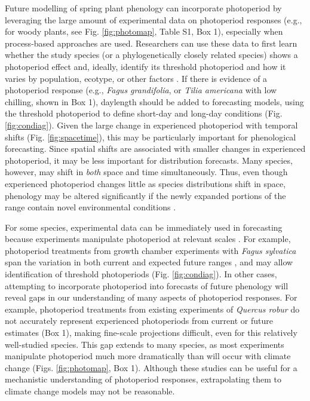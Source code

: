 \documentclass{article}
\begin{document}
\par Future modelling of spring plant phenology can incorporate photoperiod by leveraging the large amount of experimental data on photoperiod responses (e.g., for woody plants, see Fig. \ref{fig:photomap}, Table S1, Box 1), especially when process-based approaches are used. Researchers can use these data to first learn whether the study species (or a phylogenetically closely related species) shows a photoperiod effect and, ideally, identify its threshold photoperiod and how it varies by population, ecotype, or other factors \citep{tobin2008,bradshaw2006}. If there is evidence of a photoperiod response (e.g., \emph{Fagus grandifolia}, or \emph{Tilia americana} with low chilling, shown in Box 1), daylength should be added to forecasting models, using the threshold photoperiod to define short-day and long-day conditions (Fig. \ref{fig:condiag}). Given the large change in experienced photoperiod with temporal shifts (Fig. \ref{fig:spacetime}), this may be particularly important for phenological forecasting. Since spatial shifts are associated with smaller changes in experienced photoperiod, it may be less important for distribution forecasts. Many species, however, may shift in \emph{both} space and time simultaneously. Thus, even though experienced photoperiod changes little as species distributions shift in space, phenology may be altered significantly if the newly expanded portions of the range contain novel environmental conditions \citep[e.g., ][]{martin2014}.

\par For some species, experimental data can be immediately used in forecasting because experiments manipulate photoperiod at relevant scales \citep[e.g., ][Fig. \ref{fig:photomap}, Box 1, Table S1]{Heide:2015aa,Basler:2014aa}. For example, photoperiod treatments from growth chamber experiments with \emph{Fagus sylvatica} span the variation in both current and expected future ranges \citep[ Box 1, ][]{duputie2015}, and may allow identification of threshold photoperiods (Fig. \ref{fig:condiag}). In other cases, attempting to incorporate photoperiod into forecasts of future phenology will reveal gaps in our understanding of many aspects of photoperiod responses. For example, photoperiod treatments from existing experiments of \emph{Quercus robur} do not accurately represent experienced photoperiods from current or future estimates (Box 1), making fine-scale projections difficult, even for this relatively well-studied species. This gap extends to many species, as most experiments manipulate photoperiod much more dramatically than will occur with climate change (Figs. \ref{fig:photomap}, Box 1). Although these studies can be useful for a mechanistic understanding of photoperiod responses, extrapolating them to climate change models may not be reasonable. 
 
\end{document}
